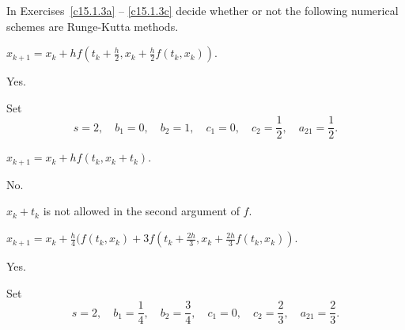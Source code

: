 \documentclass{ximera}
\begin{document}
\noindent In Exercises~\ref{c15.1.3a} -- \ref{c15.1.3c}
decide whether or not the following numerical schemes are Runge-Kutta methods.
\begin{exercise} \label{c15.1.3a}
$x_{k+1} = x_k + hf(t_k+\frac{h}{2},x_k+\frac{h}{2}f(t_k,x_k))$.

\begin{solution}
\ans Yes.

\soln Set
\[
s=2,\quad b_1=0,\quad b_2=1,\quad c_1=0,\quad c_2=\frac{1}{2},\quad
a_{21}=\frac{1}{2}.
\]


\end{solution}
\end{exercise}
\begin{exercise} \label{c15.1.3b}
$x_{k+1} = x_k + hf(t_k,x_k+t_k)$.

\begin{solution}
\ans No.

\soln $x_k+t_k$ is not allowed in the second argument of $f$.

\end{solution}
\end{exercise}
\begin{exercise} \label{c15.1.3c}
$x_{k+1} = x_k + 
\frac{h}{4}(f(t_k,x_k)+3f(t_k+\frac{2h}{3},x_k+\frac{2h}{3}f(t_k,x_k))$.

\begin{solution}
\ans Yes.

\soln Set
\[
s=2,\quad b_1=\frac{1}{4},\quad b_2=\frac{3}{4},\quad
c_1=0,\quad c_2=\frac{2}{3},\quad a_{21}=\frac{2}{3}.
\]

\end{solution}
\end{exercise}
\end{document}
